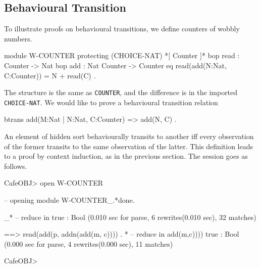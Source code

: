 \documentclass[a4paper]{memoir}
\begin{document}
\subsection{Behavioural Transition}\label{sec:p2-proving-beh-trans}

To illustrate proofs on behavioural transitions, we define
counters of wobbly numbers.\label{exs:w-counter}
\begin{vvtm}
\begin{ccode}
  module W-COUNTER {
    protecting (CHOICE-NAT)
    *[ Counter ]*
    bop read : Counter -> Nat
    bop add : Nat Counter -> Counter
    eq read(add(N:Nat, C:Counter)) = N + read(C) .
}
\end{ccode}
\end{vvtm}
The structure is the same as \verb|COUNTER|, and the difference is
in the imported \verb|CHOICE-NAT|. We would like to
prove a behavioural transition relation
\begin{vvtm}
\begin{ccode}
  btrans add(M:Nat | N:Nat, C:Counter) => add(N, C) .
\end{ccode}
\end{vvtm}
An element of hidden sort behaviourally transits to another
iff every observation of the former transits to the same
observation of the latter. This definition leads to
a proof by context induction, as in the previous section. The session goes
as follows.
\begin{vvtm}
\begin{ccode}
  CafeOBJ> open W-COUNTER

  -- opening module W-COUNTER_.*done.




  _*
  -- reduce in %
  true : Bool
  (0.010 sec for parse, 6 rewrites(0.010 sec), 32 matches)

      ==> read(add(p, addn(add(m, c)))) .
  *
  -- reduce in %
      add(m,c))))
  true : Bool
  (0.000 sec for parse, 4 rewrites(0.000 sec), 11 matches)

  CafeOBJ> 
\end{ccode}
\end{vvtm}
\end{document}
